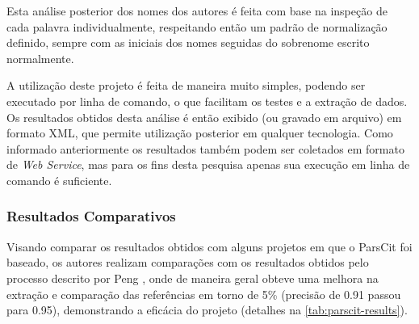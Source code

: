 Esta análise posterior dos nomes dos autores é feita com base na inspeção de cada palavra individualmente, respeitando então um padrão de normalização definido, sempre com as iniciais dos nomes seguidas do sobrenome escrito normalmente.

A utilização deste projeto é feita de maneira muito simples, podendo ser executado por linha de comando, o que facilitam os testes e a extração de dados. Os resultados obtidos desta análise é então exibido (ou gravado em arquivo) em formato XML, que permite utilização posterior em qualquer tecnologia. Como informado anteriormente os resultados também podem ser coletados em formato de \textit{Web Service}, mas para os fins desta pesquisa apenas sua execução em linha de comando é suficiente.

\subsubsection{Resultados Comparativos}
\label{sssec:parscit-comparative}

Visando comparar os resultados obtidos com alguns projetos em que o ParsCit foi baseado, os autores realizam comparações com os resultados obtidos pelo processo descrito por Peng \cite{Peng-CRF-IE}, onde de maneira geral obteve uma melhora na extração e comparação das referências em torno de 5\% (precisão de 0.91 passou para 0.95), demonstrando a eficácia do projeto (detalhes na \autoref{tab:parscit-results}).

